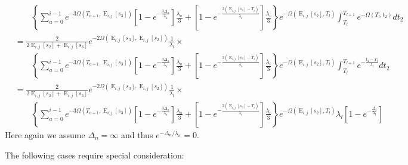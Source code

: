 \documentclass{article}
\DeclareMathOperator{\E}{E}
\begin{document}
\begin{align*}
    &\qquad\left\{\sum_{a=0}^{i-1}e^{-3\Omega(T_{a+1},\E_{i,j}[s_3])}
        \left[1-e^{-\frac{3\Delta_a}{\lambda_a}}\right]\frac{\lambda_a}{3}+
    \left[1-e^{-\frac{3\left(\E_{i,j}[s_3]-T_{i}\right)}{\lambda_{i}}}\right]
        \frac{\lambda_{i}}{3}\right\}
        e^{-\Omega(\E_{i,j}[s_2],T_l)}
        \int_{T_l}^{T_{l+1}}e^{-\Omega(T_l,t_2)}dt_2\\
    &=\frac{2}{2\E_{i,j}[s_2]+\E_{i,j}[s_3]}e^{-2\Omega(\E_{i,j}[s_3],\E_{i,j}[s_2])}\frac{1}{\lambda_{l}}\times\\
    &\qquad\left\{\sum_{a=0}^{i-1}e^{-3\Omega(T_{a+1},\E_{i,j}[s_3])}
        \left[1-e^{-\frac{3\Delta_a}{\lambda_a}}\right]\frac{\lambda_a}{3}+
    \left[1-e^{-\frac{3\left(\E_{i,j}[s_3]-T_{i}\right)}{\lambda_{i}}}\right]
        \frac{\lambda_{i}}{3}\right\}
        e^{-\Omega(\E_{i,j}[s_2],T_l)}
        \int_{T_l}^{T_{l+1}}e^{-\frac{t_2-T_l}{\lambda_l}}dt_2\\
    &=\frac{2}{2\E_{i,j}[s_2]+\E_{i,j}[s_3]}e^{-2\Omega(\E_{i,j}[s_3],\E_{i,j}[s_2])}\frac{1}{\lambda_{l}}\times\\
    &\qquad\left\{\sum_{a=0}^{i-1}e^{-3\Omega(T_{a+1},\E_{i,j}[s_3])}
        \left[1-e^{-\frac{3\Delta_a}{\lambda_a}}\right]\frac{\lambda_a}{3}+
    \left[1-e^{-\frac{3\left(\E_{i,j}[s_3]-T_{i}\right)}{\lambda_{i}}}\right]
        \frac{\lambda_{i}}{3}\right\}
        e^{-\Omega(\E_{i,j}[s_2],T_l)}
        \lambda_l\left[1-e^{-\frac{\Delta_l}{\lambda_l}}\right]
\end{align*}
Here again we assume $\Delta_n = \infty$ and thus $e^{-\Delta_n/\lambda_n} = 0$.

The following cases require special consideration:
\end{document}
